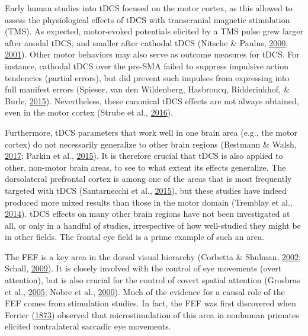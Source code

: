 \documentclass[11pt,]{memoir}
\begin{document}
Early human studies into tDCS focused on the motor cortex, as this allowed to assess the physiological effects of tDCS with transcranial magnetic stimulation (TMS). As expected, motor-evoked potentials elicited by a TMS pulse grew larger after anodal tDCS, and smaller after cathodal tDCS (Nitsche \& Paulus, \protect\hyperlink{ref-Nitsche2000}{2000}, \protect\hyperlink{ref-Nitsche2001}{2001}). Other motor behaviors may also serve as outcome measures for tDCS. For instance, cathodal tDCS over the pre-SMA failed to suppress impulsive action tendencies (partial errors), but did prevent such impulses from expressing into full manifest errors (Spieser, van den Wildenberg, Hasbroucq, Ridderinkhof, \& Burle, \protect\hyperlink{ref-Spieser2015}{2015}). Nevertheless, these canonical tDCS effects are not always obtained, even in the motor cortex (Strube et al., \protect\hyperlink{ref-Strube2016}{2016}).

Furthermore, tDCS parameters that work well in one brain area (e.g., the motor cortex) do not necessarily generalize to other brain regions (Bestmann \& Walsh, \protect\hyperlink{ref-Bestmann2017}{2017}; Parkin et al., \protect\hyperlink{ref-Parkin2015}{2015}). It is therefore crucial that tDCS is also applied to other, non-motor brain areas, to see to what extent its effects generalize. The dorsolateral prefrontal cortex is among one of the areas that is most frequently targeted with tDCS (Santarnecchi et al., \protect\hyperlink{ref-Santarnecchi2015}{2015}), but these studies have indeed produced more mixed results than those in the motor domain (Tremblay et al., \protect\hyperlink{ref-Tremblay2014a}{2014}). tDCS effects on many other brain regions have not been investigated at all, or only in a handful of studies, irrespective of how well-studied they might be in other fields. The frontal eye field is a prime example of such an area.

The FEF is a key area in the dorsal visual hierarchy (Corbetta \& Shulman, \protect\hyperlink{ref-Corbetta2002}{2002}; Schall, \protect\hyperlink{ref-Schall2009}{2009}). It is closely involved with the control of eye movements (overt attention), but is also crucial for the control of covert spatial attention (Grosbras et al., \protect\hyperlink{ref-Grosbras2005}{2005}; Nobre et al., \protect\hyperlink{ref-Nobre2000}{2000}). Much of the evidence for a causal role of the FEF comes from stimulation studies. In fact, the FEF was first discovered when Ferrier (\protect\hyperlink{ref-Ferrier1873}{1873}) observed that microstimulation of this area in nonhuman primates elicited contralateral saccadic eye movements.
\end{document}
